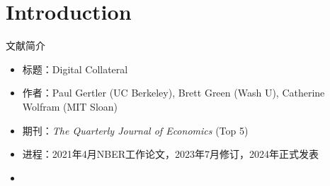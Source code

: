 \section{Introduction}

\begin{frame}{文献简介}
  \begin{itemize}
    \item 标题：Digital Collateral
    \item 作者：Paul Gertler (UC Berkeley), Brett Green (Wash U), Catherine Wolfram (MIT Sloan)
    \item 期刊：\textit{The Quarterly Journal of Economics} (Top 5)
    \item 进程：2021年4月NBER工作论文，2023年7月修订，2024年正式发表
    \item \cite{gertler2024DigitalCollateral}
  \end{itemize}
\end{frame}

